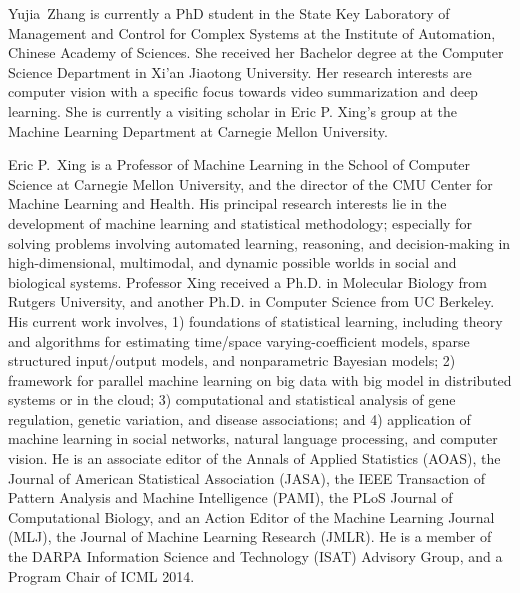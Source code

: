 \documentclass[journal]{IEEEtran}
\begin{document}
\vspace{-1cm}
\begin{IEEEbiography}{Yujia~Zhang}
is currently a PhD student in the State Key Laboratory of Management and Control for Complex Systems at the Institute of Automation, Chinese Academy of Sciences. She received her Bachelor degree at the Computer Science Department in Xi'an Jiaotong University. Her research interests are computer vision with a specific focus towards video summarization and deep learning. She is currently a visiting scholar in Eric P. Xing's group at the Machine Learning Department at Carnegie Mellon University.

\end{IEEEbiography}
\vspace{-1cm}
\begin{IEEEbiography}{Eric P.~Xing}
is a Professor of Machine Learning in the School of Computer Science at Carnegie Mellon University, and the director of the CMU Center for Machine Learning and Health. His principal research interests lie in the development of machine learning and statistical methodology; especially for solving problems involving automated learning, reasoning, and decision-making in high-dimensional, multimodal, and dynamic possible worlds in social and biological systems. Professor Xing received a Ph.D. in Molecular Biology from Rutgers University, and another Ph.D. in Computer Science from UC Berkeley. His current work involves, 1) foundations of statistical learning, including theory and algorithms for estimating time/space varying-coefficient models, sparse structured input/output models, and nonparametric Bayesian models; 2) framework for parallel machine learning on big data with big model in distributed systems or in the cloud; 3) computational and statistical analysis of gene regulation, genetic variation, and disease associations; and 4) application of machine learning in social networks, natural language processing, and computer vision. He is an associate editor of the Annals of Applied Statistics (AOAS), the Journal of American Statistical Association (JASA), the IEEE Transaction of Pattern Analysis and Machine Intelligence (PAMI), the PLoS Journal of Computational Biology, and an Action Editor of the Machine Learning Journal (MLJ), the Journal of Machine Learning Research (JMLR). He is a member of the DARPA Information Science and Technology (ISAT) Advisory Group, and a Program Chair of ICML 2014.
\end{IEEEbiography}

\enlargethispage{-1.8in}
\end{document}
